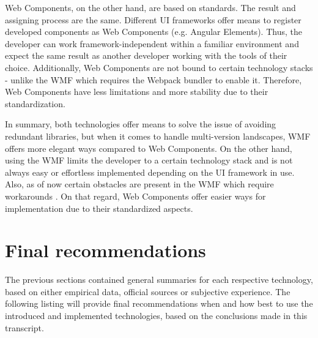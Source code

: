 Web Components, on the other hand, are based on standards. 
The result and assigning process are the same. 
Different UI frameworks offer means to register developed components as Web Components (e.g. Angular Elements). 
Thus, the developer can work framework-independent within a familiar environment and expect the same result as another developer working with the tools of their choice.
Additionally, Web Components are not bound to certain technology stacks - unlike the WMF which requires the Webpack bundler to enable it. 
Therefore, Web Components have less limitations and more stability due to their standardization.

In summary, both technologies offer means to solve the issue of avoiding redundant libraries, but when it comes to handle multi-version landscapes, WMF offers more elegant ways compared to Web Components. 
On the other hand, using the WMF limits the developer to a certain technology stack and is not always easy or effortless implemented depending on the UI framework in use. 
Also, as of now certain obstacles are present in the WMF which require workarounds \cite{wmf_the_good_and_ugly}. 
On that regard, Web Components offer easier ways for implementation due to their standardized aspects.

\section{Final recommendations}

The previous sections contained general summaries for each respective technology, based on either empirical data, official sources or subjective experience. 
The following listing will provide final recommendations when and how best to use the introduced and implemented technologies, based on the conclusions made in this transcript.

